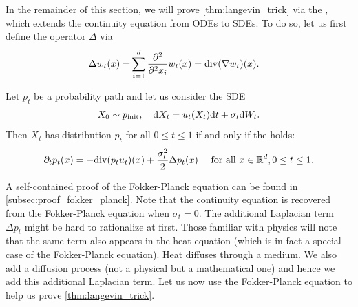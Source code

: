 In the remainder of this section, we will prove  \cref{thm:langevin_trick} via the , which extends the continuity equation from ODEs to SDEs. To do so, let us first define the  operator $\Delta$ via
\begin{align}
    \label{eq:laplacian_definition}
    \Delta w_t(x)=&\sum\limits_{i=1}^{d}\frac{\partial^2}{\partial^2 x_i}w_t(x)=\mathrm{div}(\nabla w_t)(x).
\end{align}
\begin{theorem}
\label{thm:fokker_planck}
Let $p_t$ be a probability path and let us consider the SDE
\begin{align*}
    X_0\sim p_{\rm{init}}, \quad \mathrm{d} X_t = u_t(X_t)\mathrm{d} t + \sigma_t\mathrm{d} W_t.
\end{align*}
Then $X_t$ has distribution $p_t$ for all $0\leq t\leq 1$ if and only if the  holds:
    \begin{align}
    \label{e:fokker_planck}
    \partial_t p_t(x) = -\mathrm{div} (p_t u_t)(x)+\frac{\sigma_t^2}{2}\Delta p_t (x)\quad \text{ for all }x\in\mathbb{R}^d, 0\leq t\leq 1.
    \end{align}     
\end{theorem}
A self-contained proof of the Fokker-Planck equation can be found in \cref{subsec:proof_fokker_planck}. Note that the continuity equation is recovered from the Fokker-Planck equation when $\sigma_t=0$. The additional Laplacian term $\Delta p_t$ might be hard to rationalize at first. Those familiar with physics will note that the same term also appears in the heat equation (which is in fact a special case of the Fokker-Planck equation). Heat diffuses through a medium. We also add a diffusion process (not a physical but a mathematical one) and hence we add this additional Laplacian term. 
Let us now use the Fokker-Planck equation to help us prove \cref{thm:langevin_trick}.

